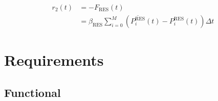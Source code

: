 \begin{description}
	\begin{equation}
		\begin{split}
			r_2(t) &= - F_\text{RES}(t) \\
			&= \beta_\text{RES} \sum^M_{i=0} (\overline{P^\text{RES}_i}(t) - P^\text{RES}_i(t)) \Delta t
		\end{split}
	\end{equation}
	
\end{description}

\section{Requirements}  \label{sec:requirements}

\subsection{Functional}

